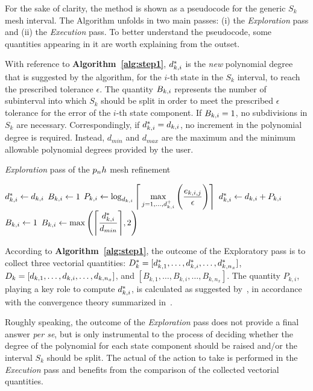 For the sake of clarity, the method is shown as a pseudocode for the generic $S_k$ mesh interval. The Algorithm unfolds in two main passes: (i) the \emph{Exploration} pass and (ii) the \emph{Execution} pass.
To better understand the pseudocode, some quantities appearing in it are worth explaining from the outset.

With reference to {\bf Algorithm~\ref{alg:step1}}, $d_{k,i}^{*}$ is the \emph{new} polynomial degree that is suggested by the algorithm, for the $i$-th state in the $S_k$ interval, to reach the prescribed tolerance $\epsilon$. The quantity $B_{k,i}$ represents the number of subinterval into which $S_k$ should be split in order to meet the prescribed $\epsilon$ tolerance for the error of the $i$-th state component. If $B_{k,i} = 1$, no subdivisions in $S_k$ are necessary. Correspondingly, if $d_{k,i}^{*} = d_{k,i}$, no increment in the polynomial degree is required. Instead, $d_{min}$ and $d_{max}$ are the maximum and the minimum allowable polynomial degrees provided by the user.
\begin{algorithm}
\caption{\emph{Exploration} pass of the $p_{n}h$ mesh refinement}\label{alg:step1}
	\begin{algorithmic}[1]
				\State $d_{k,i}^{*} \gets d_{k,i}$ 
				\State $B_{k,i} \gets 1$     
			\Else
				\State $P_{k,i} \gets \log_{d_{k,i}} \Bigg\lceil \max\limits_{j= 1, \dots, d_{k,i}^{+}} \Bigg(\dfrac{e_{k,i,j}}{\epsilon}\Bigg) \Bigg\rceil$
				\State $d_{k,i}^{*} \gets d_{k,i} + P_{k,i}$
						\State $B_{k,i} \gets 1$		
					\Else
						\State $B_{k,i} \gets \max\Bigg(\Bigg\lceil \dfrac{d_{k,i}^{*}}{d_{min}}\Bigg\rceil, 2\Bigg)$
					\EndIf
			\EndIf
		\EndFor
	\end{algorithmic}
\end{algorithm}

According to {\bf Algorithm~\ref{alg:step1}}, the outcome of the Exploratory pass is to collect three vectorial quantities: $D_{k}^{*} = [d_{k,1}^{*}, \dots, d_{k,i}^{*}, \dots, d_{k,n_x}^{*}]$, $D_{k} = [d_{k,1}, \dots, d_{k,i}, \dots, d_{k,n_x}]$, and $[B_{k,1}, \ldots, B_{k,i}, \ldots, B_{k,n_x}]$. The quantity $P_{k,i}$, playing a key role to compute $d_{k,i}^{*}$, is calculated as suggested by~\cite{Patterson:OCAM:2015}, in accordance with the convergence theory summarized in~\cite{Hou:GNC:2012,Hou:PHD:2013}.

Roughly speaking, the outcome of the \emph{Exploration} pass does not provide a final answer \emph{per se}, but is only instrumental to the process of deciding whether the degree of the polynomial for each state component should be raised and/or the interval $S_k$ should be split. The actual of the action to take is performed in the \emph{Execution} pass and benefits from the comparison of the collected vectorial quantities.

